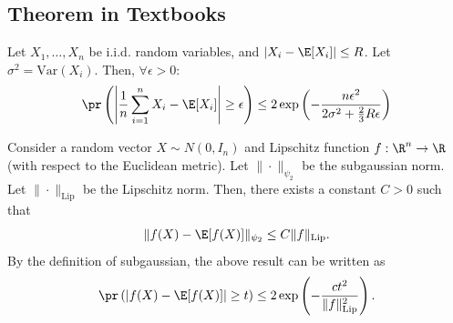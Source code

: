 


\subsection{Theorem in Textbooks}

\begin{theorem}\label{thm:bernstein}
Let $X_1,\ldots,X_n$ be i.i.d. random variables, and $
|X_i - \E[X_i]|\leq R$. Let $\sigma^2 = \text{Var}(X_i)$. Then, $\forall  \epsilon>0$:
$$\pr\left(\left|\frac{1}{n}\sum_{i=1}^n X_i - \E[X_i]\right|\geq \epsilon\right)\leq 2\exp\left(-\frac{n\epsilon^2}{2\sigma^2 + \frac{2}{3}R\epsilon}\right)$$

\end{theorem}
\begin{theorem}\label{thm:gaussian_concentration} Consider a random vector $X\sim N(0,I_n)$ and Lipschitz function $f:\R^n\rightarrow \R$ (with respect to the Euclidean metric). Let $\|\cdot\|_{\psi_2}$ be the subgaussian norm. Let $\|\cdot\|_{\mathrm{Lip}}$ be the Lipschitz norm. Then, there exists a constant $C>0$ such that
$$\|f(X)-\E[f(X)]\|_{\psi_2}\leq C\|f\|_{\mathrm{Lip}}.$$
By the definition of subgaussian, the above result can be written as 
$$\pr\left(\left|f(X)-\E[f(X)]\right|\geq t\right)\leq 2\exp\left(-\frac{ct^2}{\|f\|^2_{\mathrm{Lip}}}\right).$$

\end{theorem}

